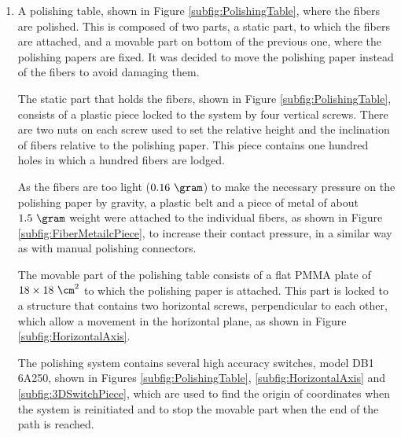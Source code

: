 \begin{enumerate}
\item{} A polishing table, shown in Figure \ref{subfig:PolishingTable}, where the fibers are polished. This is composed of two parts, a static part, to which the fibers are attached, and a movable part on bottom of the previous one, where the polishing papers are fixed. It was decided to move the polishing paper instead of the fibers to avoid damaging them.

The static part that holds the fibers, shown in Figure \ref{subfig:PolishingTable}, consists of a plastic piece locked to the system by four vertical screws. There are two nuts on each screw used to set the relative height and the inclination of fibers relative to the polishing paper. This piece contains one hundred holes in which a hundred fibers are lodged. 

As the fibers are too light ($0.16~\gram$) to make the necessary pressure on the polishing paper by gravity, a plastic belt and a piece of metal of about $1.5~\gram$ weight were attached to the individual fibers, as shown in Figure \ref{subfig:FiberMetailcPiece}, to increase their contact pressure, in a similar way as with manual polishing connectors. 

The movable part of the polishing table consists of a flat PMMA plate of $18 \times 18~\cm^2$ to which the polishing paper is attached. This part is locked to a structure \cite{StructureAxis} that contains two horizontal screws, perpendicular to each other, which allow a movement in the horizontal plane, as shown in Figure \ref{subfig:HorizontalAxis}.

The polishing system contains several high accuracy switches, model DB1 6A250, shown in Figures \ref{subfig:PolishingTable}, \ref{subfig:HorizontalAxis} and \ref{subfig:3DSwitchPiece}, which are used to find the origin of coordinates when the system is reinitiated and to stop the movable part when the end of the path is reached. 


\end{enumerate}
